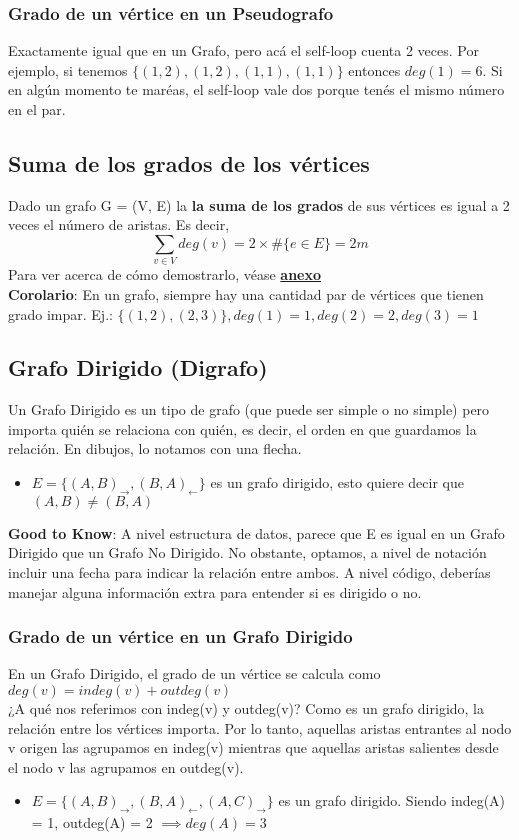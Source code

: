 \documentclass[10pt,a4paper]{article}
\begin{document}
\subsubsection*{Grado de un vértice en un Pseudografo}
Exactamente igual que en un Grafo, pero acá el self-loop cuenta 2 veces. Por ejemplo, si tenemos $\{(1,2), (1,2), (1, 1), (1, 1)\}$ entonces $deg(1) = 6$. Si en algún momento te maréas, el self-loop vale dos porque tenés el mismo número en el par.
\subsection*{Suma de los grados de los vértices}
Dado un grafo G = (V, E) la \textbf{la suma de los grados} de sus vértices es igual a 2 veces el número de aristas. Es decir, 
\[\sum_{v \in V} deg(v) = 2 \times \#\{e \in E\} = 2m\] 
Para ver acerca de cómo demostrarlo, véase \hyperref[subsubsec:suma_grados_vertices]{\textbf{anexo}} \\
\textbf{Corolario}: En un grafo, siempre hay una cantidad par de vértices que tienen grado impar. Ej.: $\{(1, 2), (2, 3)\}, deg(1) = 1, deg(2) = 2, deg(3) = 1$
\subsection*{Grafo Dirigido (Digrafo)}
Un Grafo Dirigido es un tipo de grafo (que puede ser simple o no simple) pero importa quién se relaciona con quién, es decir, el orden en que guardamos la relación. En dibujos, lo notamos con una flecha. 
\begin{itemize}
    \item $E = \{(A,B)_{\rightarrow}, (B, A)_{\leftarrow} \}$ es un grafo dirigido, esto quiere decir que $(A,B) \neq (B, A)$
\end{itemize}
\textbf{Good to Know}: A nivel estructura de datos, parece que E es igual en un Grafo Dirigido que un Grafo No Dirigido. No obstante, optamos, a nivel de notación incluir una fecha para indicar la relación entre ambos. A nivel código, deberías manejar alguna información extra para entender si es dirigido o no.
\subsubsection*{Grado de un vértice en un Grafo Dirigido}
En un Grafo Dirigido, el grado de un vértice se calcula como $deg(v) = indeg(v) + outdeg(v)$ \\
¿A qué nos referimos con indeg(v) y outdeg(v)? Como es un grafo dirigido, la relación entre los vértices importa. Por lo tanto, aquellas aristas entrantes al nodo v origen las agrupamos en indeg(v) mientras que aquellas aristas salientes desde el nodo v las agrupamos en outdeg(v).
\begin{itemize}
    \item $E = \{(A,B)_{\rightarrow}, (B, A)_{\leftarrow}, (A, C)_{\rightarrow} \}$ es un grafo dirigido. Siendo indeg(A) = 1, outdeg(A) = 2 $\implies deg(A) = 3$ 
\end{itemize}
\end{document}
